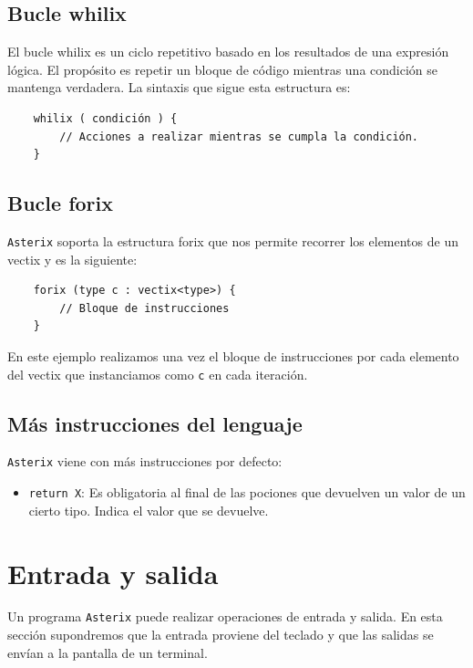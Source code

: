 \documentclass[a4paper, 10pt]{article}
\newcommand{\atx}{\texttt{Asterix} }
\begin{document}
    \subsection*{Bucle whilix}
    El bucle whilix es un ciclo repetitivo basado en los resultados
    de una expresión lógica. El propósito es repetir un bloque de código
    mientras una condición se mantenga verdadera. La sintaxis que sigue esta
    estructura es:

    \begin{verbatim}
    whilix ( condición ) {
        // Acciones a realizar mientras se cumpla la condición.
    }
    \end{verbatim}
    
    \subsection*{Bucle forix}
    \atx soporta la estructura \textsf{forix} que nos permite recorrer los
    elementos de un vectix y es la siguiente:

    \begin{verbatim}
    forix (type c : vectix<type>) {
        // Bloque de instrucciones
    }
    \end{verbatim}

    En este ejemplo realizamos una vez el bloque de instrucciones por cada
    elemento del vectix que instanciamos como \texttt{c} en cada iteración.
    
    \subsection*{Más instrucciones del lenguaje}
    \atx viene con más instrucciones por defecto:
    \begin{itemize}
        \item \texttt{return X}: Es obligatoria al final de las pociones que 
            devuelven un valor de un cierto tipo. Indica el valor que se devuelve.
    \end{itemize}  
    
    \section*{Entrada y salida}
    
    Un programa \atx puede realizar operaciones de entrada y salida. En esta
    sección supondremos que la entrada proviene del teclado y que las salidas
    se envían a la pantalla de un terminal.
    
\end{document}
